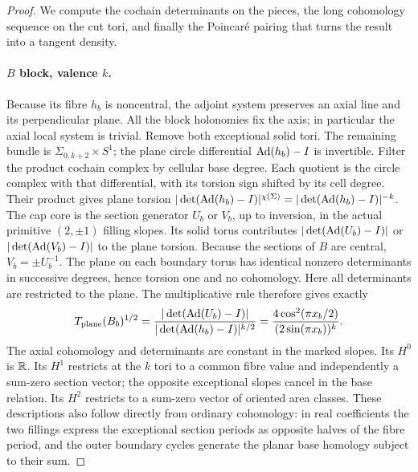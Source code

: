 \begin{proof}
We compute the cochain determinants on the pieces, the long cohomology sequence on the cut tori, and finally the Poincar\'e pairing that turns the result into a tangent density.

\paragraph{\(B\) block, valence \(k\).}
Because its fibre \(h_b\) is noncentral, the adjoint system preserves an axial line and its perpendicular plane. All the block holonomies fix the axis; in particular the axial local system is trivial. Remove both exceptional solid tori. The remaining bundle is \(\Sigma_{0,k+2}\times S^1\); the plane circle differential \(\operatorname{Ad}(h_b)-I\) is invertible. Filter the product cochain complex by cellular base degree. Each quotient is the circle complex with that differential, with its torsion sign shifted by its cell degree. Their product gives plane torsion \(|\det(\operatorname{Ad}(h_b)-I)|^{\chi(\Sigma)}=|\det(\operatorname{Ad}(h_b)-I)|^{-k}\). The cap core is the section generator \(U_b\) or \(V_b\), up to inversion, in the actual primitive \((2,\pm1)\) filling slopes. Its solid torus contributes \(|\det(\operatorname{Ad}(U_b)-I)|\) or \(|\det(\operatorname{Ad}(V_b)-I)|\) to the plane torsion. Because the sections of \(B\) are central, \(V_b=\pm U_b^{-1}\). The plane on each boundary torus has identical nonzero determinants in successive degrees, hence torsion one and no cohomology. Here all determinants are restricted to the plane. The multiplicative rule therefore gives exactly
\begin{equation}\label{eq:B}
 T_{\rm plane}(B_b)^{1/2}
 =\frac{|\det(\operatorname{Ad}(U_b)-I)|}{|\det(\operatorname{Ad}(h_b)-I)|^{k/2}}
 =\frac{4\cos^2(\pi x_b/2)}{(2\sin(\pi x_b))^k}.
\end{equation}
The axial cohomology and determinants are constant in the marked slopes. Its \(H^0\) is \(\mathbb R\). Its \(H^1\) restricts at the \(k\) tori to a common fibre value and independently a sum-zero section vector; the opposite exceptional slopes cancel in the base relation. Its \(H^2\) restricts to a sum-zero vector of oriented area classes. These descriptions also follow directly from ordinary cohomology: in real coefficients the two fillings express the exceptional section periods as opposite halves of the fibre period, and the outer boundary cycles generate the planar base homology subject to their sum.


\end{proof}
